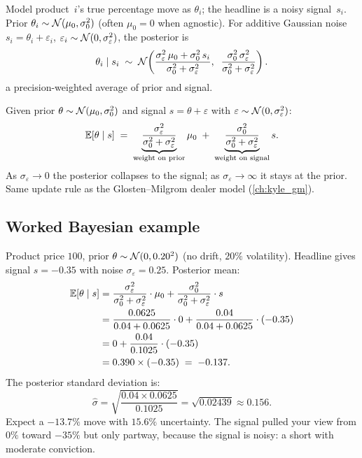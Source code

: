 Model product~$i$'s true percentage move as $\theta_i$; the
headline is a noisy signal~$s_i$.  Prior $\theta_i \sim
\mathcal{N}(\mu_0, \sigma_0^2)$ (often $\mu_0 = 0$ when agnostic).
For additive Gaussian noise $s_i = \theta_i + \varepsilon_i$,
$\varepsilon_i \sim \mathcal{N}(0, \sigma_\varepsilon^2)$, the
posterior is
\begin{equation}
  \theta_i \mid s_i
  \;\sim\;
  \mathcal{N}\!\left(
    \frac{\sigma_\varepsilon^2 \,\mu_0 +
          \sigma_0^2 \, s_i}
         {\sigma_0^2 + \sigma_\varepsilon^2},
    \;\;
    \frac{\sigma_0^2 \, \sigma_\varepsilon^2}
         {\sigma_0^2 + \sigma_\varepsilon^2}
  \right).
  \label{eq:ch25_bayesian_update}
\end{equation}
a precision-weighted average of prior and signal.

\begin{keyfactbox}
Given prior $\theta \sim \mathcal{N}(\mu_0, \sigma_0^2)$ and
signal $s = \theta + \varepsilon$ with
$\varepsilon \sim \mathcal{N}(0, \sigma_\varepsilon^2)$:
\[
  \mathbb{E}[\theta \mid s]
  \;=\;
  \underbrace{\frac{\sigma_\varepsilon^2}
    {\sigma_0^2 + \sigma_\varepsilon^2}}_{\text{weight on prior}}
  \mu_0
  \;+\;
  \underbrace{\frac{\sigma_0^2}
    {\sigma_0^2 + \sigma_\varepsilon^2}}_{\text{weight on signal}}
  s.
\]
As $\sigma_\varepsilon \to 0$ the posterior collapses to the
signal; as $\sigma_\varepsilon \to \infty$ it stays at the prior.
Same update rule as the Glosten--Milgrom dealer model
(\cref{ch:kyle_gm}).
\end{keyfactbox}

\subsection{Worked Bayesian example}

Product price $100$, prior $\theta \sim \mathcal{N}(0, 0.20^2)$
(no drift, $20\%$ volatility).  Headline gives signal $s = -0.35$
with noise $\sigma_\varepsilon = 0.25$.  Posterior mean:
\begin{align*}
  \mathbb{E}[\theta \mid s]
  &= \frac{\sigma_\varepsilon^2}{\sigma_0^2 + \sigma_\varepsilon^2}
  \cdot \mu_0
  + \frac{\sigma_0^2}{\sigma_0^2 + \sigma_\varepsilon^2} \cdot s \\
  &= \frac{0.0625}{0.04 + 0.0625} \cdot 0
  + \frac{0.04}{0.04 + 0.0625} \cdot (-0.35) \\
  &= 0 + \frac{0.04}{0.1025} \cdot (-0.35) \\
  &= 0.390 \times (-0.35)
  \;=\; -0.137.
\end{align*}
The posterior standard deviation is:
\[
  \hat{\sigma} = \sqrt{\frac{0.04 \times 0.0625}{0.1025}}
  = \sqrt{0.02439} \approx 0.156.
\]
Expect a $-13.7\%$ move with $15.6\%$ uncertainty.  The signal
pulled your view from $0\%$ toward $-35\%$ but only partway,
because the signal is noisy: a short with moderate conviction.

